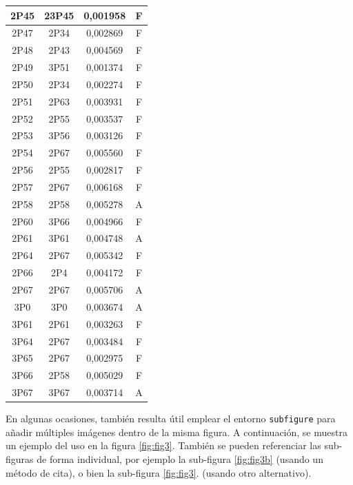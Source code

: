 \documentclass[spanish,openright]{book}
\begin{document}
\begin{center}
\begin{longtable}{|c|c|c|c|}
    \hline	2P45	&	23P45	&	0,001958	&	F	\\
    \hline	2P47	&	2P34	&	0,002869	&	F	\\
    \hline	2P48	&	2P43	&	0,004569	&	F	\\
    \hline	2P49	&	3P51	&	0,001374	&	F	\\
    \hline	2P50	&	2P34	&	0,002274	&	F	\\
    \hline	2P51	&	2P63	&	0,003931	&	F	\\
    \hline	2P52	&	2P55	&	0,003537	&	F	\\
    \hline	2P53	&	3P56	&	0,003126	&	F	\\
    \hline	2P54	&	2P67	&	0,005560	&	F	\\
    \hline	2P56	&	2P55	&	0,002817	&	F	\\
    \hline	2P57	&	2P67	&	0,006168	&	F	\\
    \hline	2P58	&	2P58	&	0,005278	&	A	\\
    \hline	2P60	&	3P66	&	0,004966	&	F	\\
    \hline	2P61	&	3P61	&	0,004748	&	A	\\
    \hline	2P64	&	2P67	&	0,005342	&	F	\\
    \hline	2P66	&	2P4	&	0,004172	&	F	\\
    \hline	2P67	&	2P67	&	0,005706	&	A	\\
    \hline	3P0	&	3P0	&	0,003674	&	A	\\
    \hline	3P61	&	2P61	&	0,003263	&	F	\\
    \hline	3P64	&	2P67	&	0,003484	&	F	\\
    \hline	3P65	&	2P67	&	0,002975	&	F	\\
    \hline	3P66	&	2P58	&	0,005029	&	F	\\
    \hline	3P67	&	3P67	&	0,003714	&	A	\\
	\end{longtable}
\end{center}





En algunas ocasiones, también resulta útil emplear el entorno
\texttt{subfigure} para añadir múltiples imágenes dentro de la misma
figura. A continuación, se muestra un ejemplo del uso en la figura
\ref{fig:fig3}. También se pueden referenciar las sub-figuras de forma
individual, por ejemplo la sub-figura \ref{fig:fig3b} (usando un método
de cita), o bien la sub-figura \ref{fig:fig3}. (usando
otro alternativo).
\end{document}

